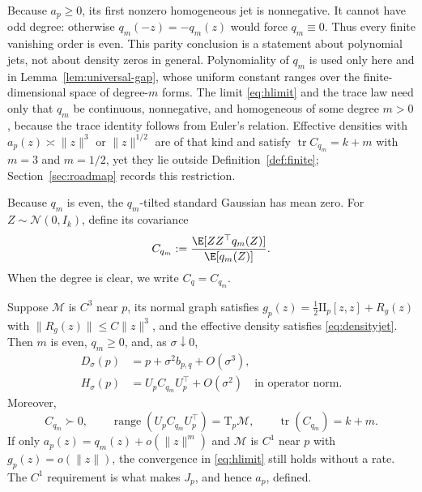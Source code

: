 \documentclass[10pt]{article}
\theoremstyle{c2fup}
\newcommand{\M}{\mathcal{M}}
\newcommand{\T}{\mathrm{T}}
\newcommand{\tr}{\operatorname{tr}}
\newcommand{\range}{\operatorname{range}}
\newcommand{\cN}{\mathcal{N}}
\begin{document}
Because $a_p\ge0$, its first nonzero homogeneous jet is nonnegative.  It cannot have odd degree: otherwise $q_m(-z)=-q_m(z)$ would force $q_m\equiv0$.  Thus every finite vanishing order is even.  This parity conclusion is a statement about polynomial jets, not about density zeros in general.  Polynomiality of $q_m$ is used only here and in Lemma~\ref{lem:universal-gap}, whose uniform constant ranges over the finite-dimensional space of degree-$m$ forms.  The limit \eqref{eq:hlimit} and the trace law need only that $q_m$ be continuous, nonnegative, and homogeneous of some degree $m>0$, because the trace identity follows from Euler's relation.  Effective densities with $a_p(z)\asymp\|z\|^{3}$ or $\|z\|^{1/2}$ are of that kind and satisfy $\tr C_{q_m}=k+m$ with $m=3$ and $m=1/2$, yet they lie outside Definition~\ref{def:finite}; Section~\ref{sec:roadmap} records this restriction.

Because $q_m$ is even, the $q_m$-tilted standard Gaussian has mean zero.  For $Z\sim\cN(0,I_k)$, define its covariance
\begin{equation}
  C_{q_m}
  :=\frac{\E[ZZ^\top q_m(Z)]}{\E[q_m(Z)]}.
  \label{eq:Cq}
\end{equation}
When the degree is clear, we write $C_q=C_{q_m}$.

\begin{theorem}
\label{thm:finite}
Suppose $\M$ is $C^3$ near $p$, its normal graph satisfies
$g_p(z)=\tfrac12\mathrm{II}_p[z,z]+R_g(z)$ with
$\|R_g(z)\|\le C\|z\|^3$, and the effective density satisfies
\eqref{eq:densityjet}.  Then $m$ is even, $q_m\ge0$, and, as $\sigma\downarrow0$,
\begin{align}
  D_\sigma(p)&=p+\sigma^2b_{p,q}+O(\sigma^3),
  \label{eq:meanlimit}\\
  H_\sigma(p)&=U_pC_{q_m}U_p^\top+O(\sigma^2)
  \quad\text{in operator norm}.
  \label{eq:hlimit}
\end{align}
Moreover,
\begin{equation}
  C_{q_m}\succ0,\qquad
  \range(U_pC_{q_m}U_p^\top)=\T_p\M,\qquad
  \tr(C_{q_m})=k+m.
  \label{eq:trace}
\end{equation}
If only $a_p(z)=q_m(z)+o(\|z\|^m)$ and $\M$ is $C^1$ near $p$ with $g_p(z)=o(\|z\|)$, the convergence in \eqref{eq:hlimit} still holds without a rate.  The $C^1$ requirement is what makes $J_p$, and hence $a_p$, defined.
\end{theorem}
\end{document}
